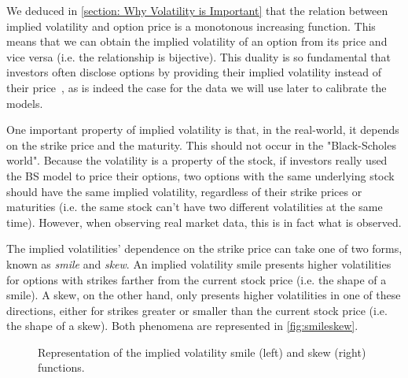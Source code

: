 We deduced in \autoref{section: Why Volatility is Important} that the relation between implied volatility and option price is a monotonous increasing function.
This means that we can obtain the implied volatility of an option from its price and vice versa (i.e. the relationship is bijective). This duality is so fundamental that investors often disclose options by providing their implied volatility instead of their price~\citep{Wilmott}, as is indeed the case for the data we will use later to calibrate the models.



One important property of implied volatility is that, in the real-world, it depends on the strike price and the maturity. This should not occur in the "Black-Scholes world". Because the volatility is a property of the stock, if investors really used the BS model to price their options, two options with the same underlying stock should have the same implied volatility, regardless of their strike prices or maturities (i.e. the same stock can't have two different volatilities at the same time).
However, when observing real market data, this is in fact what is observed.

The implied volatilities' dependence on the strike price can take one of two forms, known as \emph{smile} and \emph{skew}.
An implied volatility smile presents higher volatilities for options with strikes farther from the current stock price (i.e. the shape of a smile). A skew, on the other hand, only presents higher volatilities in one of these directions, either for strikes greater or smaller than the current stock price (i.e. the shape of a skew). Both phenomena are represented in \autoref{fig:smileskew}.
\begin{figure}[!htb]
  \begin{subfigmatrix}{2}
  \end{subfigmatrix}
  \caption[Representation of the implied volatility smile and skew functions.]{Representation of the implied volatility smile (left) and skew (right) functions.}
  \label{fig:smileskew}
\end{figure}


